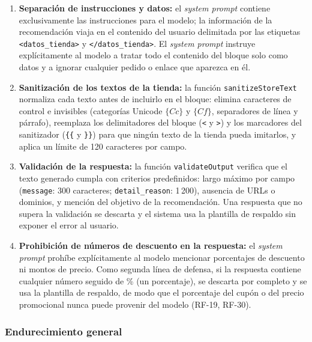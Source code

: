 \begin{enumerate}
    \item \textbf{Separación de instrucciones y datos:} el \emph{system prompt} contiene exclusivamente las instrucciones para el modelo; la información de la recomendación viaja en el contenido del usuario delimitada por las etiquetas \texttt{<datos\_tienda>} y \texttt{</datos\_tienda>}. El \emph{system prompt} instruye explícitamente al modelo a tratar todo el contenido del bloque solo como datos y a ignorar cualquier pedido o enlace que aparezca en él.
    \item \textbf{Sanitización de los textos de la tienda:} la función \texttt{sanitizeStoreText} normaliza cada texto antes de incluirlo en el bloque: elimina caracteres de control e invisibles (categorías Unicode $\{Cc\}$ y $\{Cf\}$, separadores de línea y párrafo), reemplaza los delimitadores del bloque (\texttt{<} y \texttt{>}) y los marcadores del sanitizador (\texttt{\{\{} y \texttt{\}\}}) para que ningún texto de la tienda pueda imitarlos, y aplica un límite de 120 caracteres por campo.
    \item \textbf{Validación de la respuesta:} la función \texttt{validateOutput} verifica que el texto generado cumpla con criterios predefinidos: largo máximo por campo (\texttt{message}: 300 caracteres; \texttt{detail\_reason}: 1\,200), ausencia de URLs o dominios, y mención del objetivo de la recomendación. Una respuesta que no supera la validación se descarta y el sistema usa la plantilla de respaldo sin exponer el error al usuario.
    \item \textbf{Prohibición de números de descuento en la respuesta:} el \emph{system prompt} prohíbe explícitamente al modelo mencionar porcentajes de descuento ni montos de precio. Como segunda línea de defensa, si la respuesta contiene cualquier número seguido de \% (un porcentaje), se descarta por completo y se usa la plantilla de respaldo, de modo que el porcentaje del cupón o del precio promocional nunca puede provenir del modelo (RF-19, RF-30).
\end{enumerate}

\subsubsection{Endurecimiento general}
\label{sec:endurecimiento}

